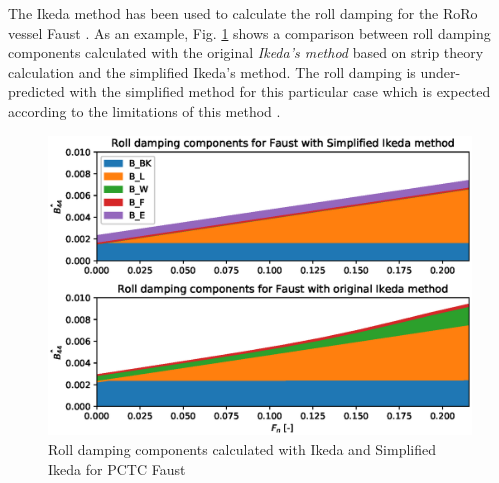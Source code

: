 


The Ikeda method has been used to calculate the roll damping for the RoRo vessel Faust \parencite{soder_assessment_2019}. As an example, Fig. \ref{fig:ikeda_vs_simplified} shows a comparison between roll damping components calculated with the original \emph{Ikeda's method} based on strip theory calculation and the simplified Ikeda's method. The roll damping is under-predicted with the simplified method for this particular case which is expected according to the limitations of this method  \parencite{kawahara_simple_2011}.

\begin{figure}[H]
    \centering
    \includegraphics[width=15cm]{figures/ikeda_vs_simplified.eps}
    \caption{Roll damping components calculated with Ikeda and Simplified Ikeda for PCTC Faust}
    \label{fig:ikeda_vs_simplified}
\end{figure}


